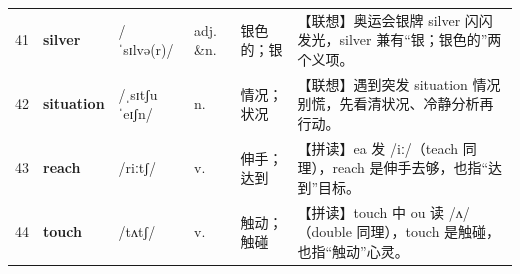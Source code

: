 \documentclass[UTF8,a4paper,11pt,oneside]{ctexbook}
\newcommand{\cellword}[1]{{\bfseries\textcolor{wordcol}{#1}}}
\newcommand{\cellipa}[1]{{\footnotesize\textcolor{ipacol}{#1}}}
\newcommand{\cellpos}[1]{\textcolor{poscol}{#1}}
\newcommand{\cellno}[1]{\textcolor{volcolor!75!black}{#1}}
\begin{document}
{\begin{longtable}{@{}C{0.045\textwidth}L{0.155\textwidth}L{0.175\textwidth}C{0.070\textwidth}L{0.180\textwidth}L{0.282\textwidth}@{}}
 \cellno{41} & \cellword{silver} & \cellipa{/ˈsɪlvə(r)/} & \cellpos{adj. \&n.} & 银色的；银 & \textcolor{tagAssoc}{【联想】}奥运会银牌 silver 闪闪发光，silver 兼有“银；银色的”两个义项。 \\
\cellno{42} & \cellword{situation} & \cellipa{/ˌsɪtʃuˈeɪʃn/} & \cellpos{n.} & 情况；状况 & \textcolor{tagAssoc}{【联想】}遇到突发 situation 情况别慌，先看清状况、冷静分析再行动。 \\
 \cellno{43} & \cellword{reach} & \cellipa{/riːtʃ/} & \cellpos{v.} & 伸手；达到 & \textcolor{tagSpell}{【拼读】}ea 发 /iː/（teach 同理），reach 是伸手去够，也指“达到”目标。 \\
\cellno{44} & \cellword{touch} & \cellipa{/tʌtʃ/} & \cellpos{v.} & 触动；触碰 & \textcolor{tagSpell}{【拼读】}touch 中 ou 读 /ʌ/（double 同理），touch 是触碰，也指“触动”心灵。 \\
\end{longtable}
}

\end{document}
